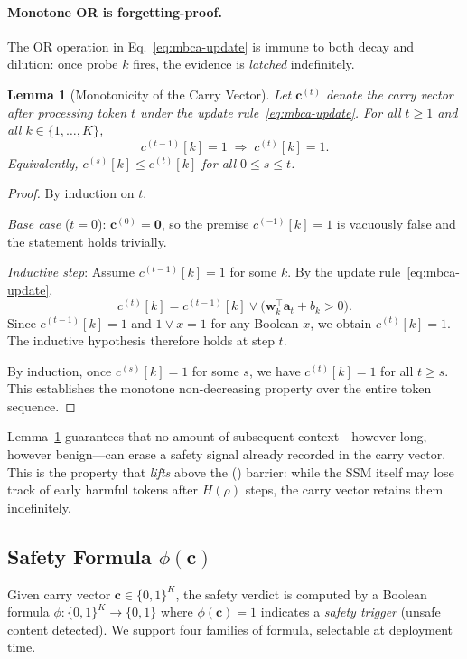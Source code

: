 \documentclass{article}
\newtheorem{lemma}[theorem]{Lemma}
\newcommand{\Horizon}{\mathcal{H}(\rho)}
\newcommand{\MBCA}{\mathrm{MBCA}}
\begin{document}
\paragraph{Monotone OR is forgetting-proof.}
The OR operation in Eq.~\eqref{eq:mbca-update} is immune to both decay and
dilution: once probe $k$ fires, the evidence is \emph{latched} indefinitely.

\begin{lemma}[Monotonicity of the Carry Vector]
\label{lem:mbca-monotone}
Let $\mathbf{c}^{(t)}$ denote the carry vector after processing token $t$ under
the update rule~\eqref{eq:mbca-update}.  For all $t \geq 1$ and all
$k \in \{1,\ldots,K\}$,
\[
  c^{(t-1)}[k] = 1 \;\Longrightarrow\; c^{(t)}[k] = 1.
\]
Equivalently, $c^{(s)}[k] \leq c^{(t)}[k]$ for all $0 \leq s \leq t$.
\end{lemma}

\begin{proof}
By induction on $t$.

\emph{Base case} ($t = 0$): $\mathbf{c}^{(0)} = \mathbf{0}$, so the premise
$c^{(-1)}[k] = 1$ is vacuously false and the statement holds trivially.

\emph{Inductive step}: Assume $c^{(t-1)}[k] = 1$ for some $k$.  By the update
rule~\eqref{eq:mbca-update},
\[
  c^{(t)}[k] = c^{(t-1)}[k] \vee \bigl(\mathbf{w}_k^{\top}\mathbf{a}_t + b_k > 0\bigr).
\]
Since $c^{(t-1)}[k] = 1$ and $1 \vee x = 1$ for any Boolean $x$, we obtain
$c^{(t)}[k] = 1$.  The inductive hypothesis therefore holds at step $t$.

By induction, once $c^{(s)}[k] = 1$ for some $s$, we have $c^{(t)}[k] = 1$
for all $t \geq s$.  This establishes the monotone non-decreasing property over
the entire token sequence.
\end{proof}

\noindent Lemma~\ref{lem:mbca-monotone} guarantees that no amount of subsequent
context---however long, however benign---can erase a safety signal already
recorded in the carry vector.  This is the property that \emph{lifts} \MBCA{}
above the \Horizon{} barrier: while the SSM itself may lose track of early
harmful tokens after $H(\rho)$ steps, the carry vector retains them indefinitely.

\subsection{Safety Formula $\phi(\mathbf{c})$}
\label{sec:mbca:formula}

Given carry vector $\mathbf{c} \in \{0,1\}^K$, the safety verdict is computed by
a Boolean formula $\phi : \{0,1\}^K \to \{0,1\}$ where $\phi(\mathbf{c}) = 1$
indicates a \emph{safety trigger} (unsafe content detected).  We support four
families of formula, selectable at deployment time.
\end{document}
